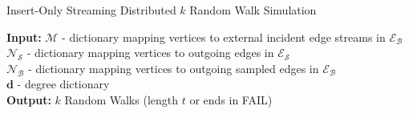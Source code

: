 \documentclass[10]{report}
\newcommand{\algoname}[1]{\textnormal{\textsc{#1}}}
\begin{document}
\begin{algorithm}[htbp] 
\caption{Insert-Only Streaming Distributed $k$ Random Walk Simulation}\label{alg:rw:distributed:insert-only:simulation:playback}
\begin{flushleft}
        \textbf{Input:} 		$\mathcal{M}$ - dictionary mapping vertices to external incident edge streams in $\mathcal{E}_\mathcal{B}$ \\
        	\hspace{3.15em}	$\mathcal{N}_\mathcal{S}$ - dictionary mapping vertices to outgoing edges in $\mathcal{E}_\mathcal{S}$ \\
        	\hspace{3.15em}	$\mathcal{N}_\mathcal{B}$ - dictionary mapping vertices to outgoing sampled edges in $\mathcal{E}_\mathcal{B}$ \\
        	\hspace{3.15em}	$\mathbf{d}$ - degree dictionary \\
        \textbf{Output:} $k$ Random Walks (length $t$ or ends in FAIL)

\end{flushleft}
\end{algorithm}
\end{document}
